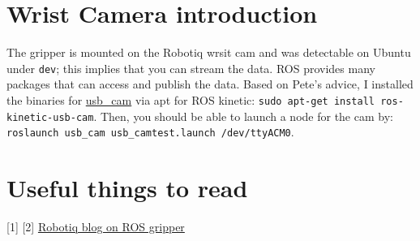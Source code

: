 \documentclass[a4paper]{article}
\begin{document}
\section{Wrist Camera introduction}
The gripper is mounted on the Robotiq wrsit cam and was detectable on
Ubuntu under \texttt{dev}; this implies that you can stream the data.
ROS provides many packages that can access and  publish the data. Based
on Pete's advice, I installed the binaries for
\href{http://wiki.ros.org/usb\_cam}{usb\_cam} via apt for ROS
kinetic: \texttt{sudo apt-get install ros-kinetic-usb-cam}. Then,
you should be able to launch a node for the cam by:
\texttt{roslaunch usb\_cam usb\_cam\-test.launch /dev/ttyACM0}.

\section{Useful things to read}
[1] 
[2] \href{https://blog.robotiq.com/bid/58716/Robotiq-s-Adaptive-Robot-Gripper-Now-on-ROS-Industrial}{Robotiq blog on ROS gripper}
\end{document}
